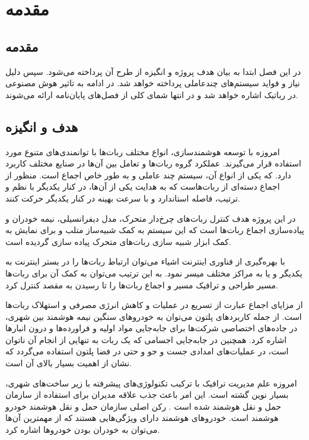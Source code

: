 \chapter{مقدمه}

\section{مقدمه}

در این فصل ابتدا به بیان هدف پروژه و انگیزه از طرح آن پرداخته می‌شود. سپس دلیل نیاز و فواید سیستم‌های چندعاملی پرداخته خواهد شد. در ادامه به تاثیر هوش مصنوعی در رباتیک اشاره خواهد شد و در انتها شمای کلی از فصل‌های پایان‌نامه ارائه می‌شوند.

\section{هدف و انگیزه}
امروزه با توسعه هوشمندسازی، انواع مختلف ربات‌ها با توانمندی‌های متنوع مورد استفاده قرار می‌گیرند. عملکرد گروه ربات‌ها و تعامل بین آن‌ها در صنایع مختلف کاربرد دارد. که یکی از انواع آن، سیستم چند عاملی و به طور خاص اجماع است. منظور از اجماع دسته‌ای از ربات‌هاست که به هدایت یکی از آن‌ها، در کنار یکدیگر با نظم و ترتیب، فاصله استاندارد و با سرعت بهینه در کنار یکدیگر حرکت کنند.

در این پروژه هدف کنترل ربات‌های چرخ‌دار متحرک، مدل دیفرانسیلی، نیمه خودران و پیاده‌سازی اجماع ربات‌ها است که این سیستم به کمک شبیه‌ساز متلب و برای نمایش به کمک ابزار شبیه سازی ربات‌های متحرک پیاده سازی گردیده است.

با بهره‌گیری از فناوری اینترنت اشیاء می‌توان ارتباط ربات‌ها را در بستر اینترنت به یکدیگر و یا به مراکز مختلف میسر نمود. به این ترتیب می‌توان به کمک آن برای ربات‌ها مسیر طراحی‌ و ترافیک مسیر و اجماع ربات‌ها را تا رسیدن به مقصد کنترل کرد.

از مزایای اجماع عبارت از تسریع در عملیات‌ و کاهش انرژی مصرفی و استهلاک ربات‌ها است. از جمله کاربردهای پلتون می‌توان به خودروهای سنگین نیمه هوشمند بین شهری، در جاده‌های اختصاصی شرکت‌ها برای جابه‌جایی مواد اولیه و فراورده‌ها و درون انبارها اشاره کرد. همچنین در جابه‌جایی اجسامی که یک ربات به تنهایی از انجام آن ناتوان است، در عملیات‌های امدادی جست و جو و حتی در فضا پلتون استفاده می‌گردد که نشان از اهمیت بسیار بالای آن است.

امروزه علم مدیریت ترافیک با ترکیب تکنولوژی‌های پیشرفته با زیر ساخت‌های شهری، بسیار نوین گشته است. این امر باعث جذب علاقه مدیران برای استفاده از سازمان حمل و نقل هوشمند شده است \cite{baskar2011traffic}. رکن اصلی سازمان حمل و نقل هوشمند خودرو هوشمند است. خودروهای هوشمند دارای ویژگی‌هایی هستند که از مهمترین آن‌ها می‌توان به خودران بودن خودروها اشاره کرد.

